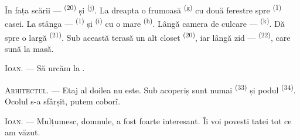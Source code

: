 În fața scării ---  \textsuperscript{(20)} și  \textsuperscript{(j)}. La dreapta o 
frumoasă \textsuperscript{(g)} cu două ferestre spre 
\textsuperscript{(1)} casei. La stânga ---  \textsuperscript{(1)} și
 \textsuperscript{(i)} cu o  mare
\textsuperscript{(h)}. Lângă camera de culcare --- 
\textsuperscript{(k)}. Dă spre o  largă \textsuperscript{(21)}. Sub
această terasă un alt closet \textsuperscript{(20)}, iar lângă zid ---
 \textsuperscript{(22)}, care sună la masă.

\textsc{Ioan}. --- Să urcăm la .

\textsc{Arhitectul}. --- Etaj al doilea nu este. Sub acoperiș sunt numai
 \textsuperscript{(33)} și podul \textsuperscript{(34)}.
Ocolul s-a sfârșit, putem coborî.

\textsc{Ioan}. --- Mulțumesc, domnule, a fost foarte interesant. Îi voi povesti
tatei tot ce am văzut.
\VUsaut{4.0mm}
\VUfilet{22mm}
